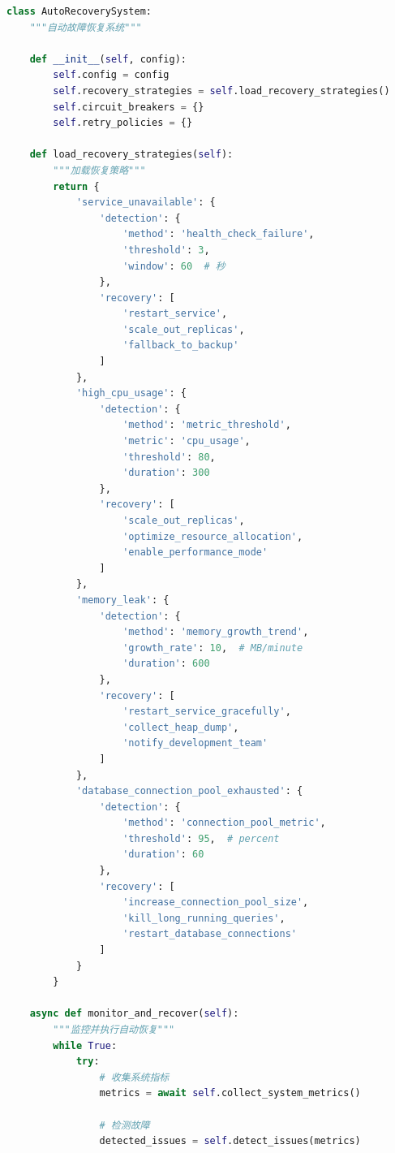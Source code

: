 \begin{lstlisting}[language=Python]
class AutoRecoverySystem:
    """自动故障恢复系统"""
    
    def __init__(self, config):
        self.config = config
        self.recovery_strategies = self.load_recovery_strategies()
        self.circuit_breakers = {}
        self.retry_policies = {}
        
    def load_recovery_strategies(self):
        """加载恢复策略"""
        return {
            'service_unavailable': {
                'detection': {
                    'method': 'health_check_failure',
                    'threshold': 3,
                    'window': 60  # 秒
                },
                'recovery': [
                    'restart_service',
                    'scale_out_replicas',
                    'fallback_to_backup'
                ]
            },
            'high_cpu_usage': {
                'detection': {
                    'method': 'metric_threshold',
                    'metric': 'cpu_usage',
                    'threshold': 80,
                    'duration': 300
                },
                'recovery': [
                    'scale_out_replicas',
                    'optimize_resource_allocation',
                    'enable_performance_mode'
                ]
            },
            'memory_leak': {
                'detection': {
                    'method': 'memory_growth_trend',
                    'growth_rate': 10,  # MB/minute
                    'duration': 600
                },
                'recovery': [
                    'restart_service_gracefully',
                    'collect_heap_dump',
                    'notify_development_team'
                ]
            },
            'database_connection_pool_exhausted': {
                'detection': {
                    'method': 'connection_pool_metric',
                    'threshold': 95,  # percent
                    'duration': 60
                },
                'recovery': [
                    'increase_connection_pool_size',
                    'kill_long_running_queries',
                    'restart_database_connections'
                ]
            }
        }
    
    async def monitor_and_recover(self):
        """监控并执行自动恢复"""
        while True:
            try:
                # 收集系统指标
                metrics = await self.collect_system_metrics()
                
                # 检测故障
                detected_issues = self.detect_issues(metrics)
                

\end{lstlisting}
